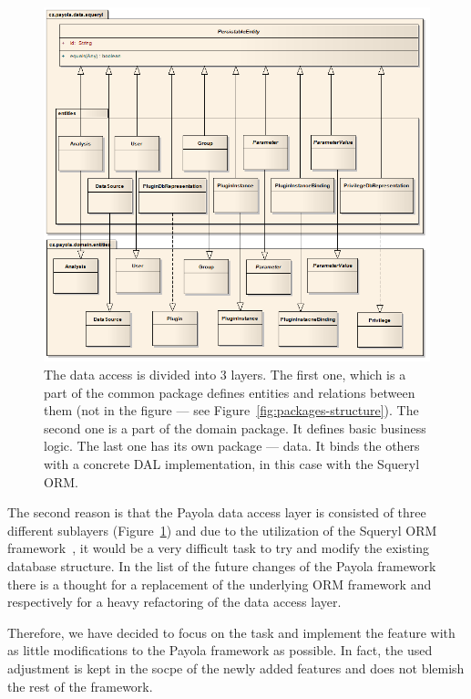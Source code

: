 \begin{figure}
	\centering
	\includegraphics[width=140mm]{img/data_entities.png}
	\caption{The data access is divided into 3 layers. The first one, which is a part of
	the common package defines entities and relations between them (not in the figure ---
	see Figure~\ref{fig:packages-structure}).
	The second one is a part of the domain package. It defines basic business logic.
	The last one has its own package --- data. It binds the others with a concrete DAL
	implementation, in this case with the Squeryl ORM. ~\cite{payola:dg}}
	\label{fig:3-layers}
\end{figure}

The second reason is that the Payola data access layer is consisted of three different sublayers
(Figure~\ref{fig:3-layers}) and 
due to the utilization of the Squeryl ORM framework~\cite{squeryl}, it would be a very difficult 
task to try and modify the existing database structure. In the list of the future changes of 
the Payola framework there is a thought for a replacement of the underlying ORM framework
and respectively for a 
heavy refactoring of the data access layer.

Therefore, we have decided to focus on the task and implement the feature with 
as little modifications to the Payola framework as possible. In fact, the used adjustment is
kept in the socpe of the newly added features and does not blemish the rest of the framework.

